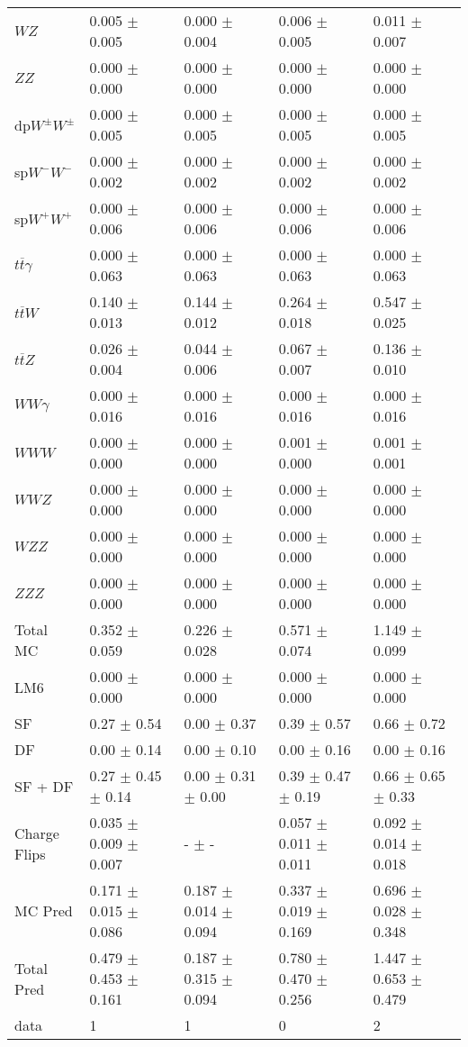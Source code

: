 \begin{tabular}{l | l l l l}
$WZ$ &  0.005 $\pm$  0.005 &  0.000 $\pm$  0.004 &  0.006 $\pm$  0.005 &  0.011 $\pm$  0.007\\
$ZZ$ &  0.000 $\pm$   0.000 &  0.000 $\pm$   0.000 &  0.000 $\pm$   0.000 &  0.000 $\pm$   0.000\\
\hline
dp$W^{\pm}W^{\pm}$ &  0.000 $\pm$  0.005 &  0.000 $\pm$  0.005 &  0.000 $\pm$  0.005 &  0.000 $\pm$  0.005\\
sp$W^{-}W^{-}$ &  0.000 $\pm$  0.002 &  0.000 $\pm$  0.002 &  0.000 $\pm$  0.002 &  0.000 $\pm$  0.002\\
sp$W^{+}W^{+}$ &  0.000 $\pm$  0.006 &  0.000 $\pm$  0.006 &  0.000 $\pm$  0.006 &  0.000 $\pm$  0.006\\
$t\overline{t}\gamma$ &  0.000 $\pm$  0.063 &  0.000 $\pm$  0.063 &  0.000 $\pm$  0.063 &  0.000 $\pm$  0.063\\
$t\overline{t}W$ &  0.140 $\pm$  0.013 &  0.144 $\pm$  0.012 &  0.264 $\pm$  0.018 &  0.547 $\pm$  0.025\\
$t\overline{t}Z$ &  0.026 $\pm$  0.004 &  0.044 $\pm$  0.006 &  0.067 $\pm$  0.007 &  0.136 $\pm$  0.010\\
$WW\gamma$ &  0.000 $\pm$  0.016 &  0.000 $\pm$  0.016 &  0.000 $\pm$  0.016 &  0.000 $\pm$  0.016\\
$WWW$ &   0.000 $\pm$   0.000 &   0.000 $\pm$   0.000 &  0.001 $\pm$   0.000 &  0.001 $\pm$  0.001\\
$WWZ$ &  0.000 $\pm$   0.000 &  0.000 $\pm$   0.000 &  0.000 $\pm$   0.000 &  0.000 $\pm$   0.000\\
$WZZ$ &  0.000 $\pm$   0.000 &  0.000 $\pm$   0.000 &  0.000 $\pm$   0.000 &  0.000 $\pm$   0.000\\
$ZZZ$ &  0.000 $\pm$   0.000 &   0.000 $\pm$   0.000 &   0.000 $\pm$   0.000 &   0.000 $\pm$   0.000\\
\hline
Total MC &  0.352 $\pm$  0.059 &  0.226 $\pm$  0.028 &  0.571 $\pm$  0.074 &  1.149 $\pm$  0.099\\
\hline\hline
\hline
LM6 &  0.000 $\pm$  0.000 &  0.000 $\pm$  0.000 &  0.000 $\pm$  0.000 &  0.000 $\pm$  0.000\\
\hline\hline
\hline\hline
 SF  & 0.27 $\pm$ 0.54 & 0.00 $\pm$ 0.37 & 0.39 $\pm$ 0.57 & 0.66 $\pm$ 0.72\\
 DF  & 0.00 $\pm$ 0.14 & 0.00 $\pm$ 0.10 & 0.00 $\pm$ 0.16 & 0.00 $\pm$ 0.16\\
\hline
 SF + DF  & 0.27 $\pm$ 0.45 $\pm$ 0.14 & 0.00 $\pm$ 0.31 $\pm$ 0.00 & 0.39 $\pm$ 0.47 $\pm$ 0.19 & 0.66 $\pm$ 0.65 $\pm$ 0.33\\
\hline\hline
Charge Flips & 0.035 $\pm$ 0.009 $\pm$ 0.007 & - $\pm$ - & 0.057 $\pm$ 0.011 $\pm$ 0.011 & 0.092 $\pm$ 0.014 $\pm$ 0.018\\
\hline\hline
\hline
MC Pred &  0.171 $\pm$  0.015 $\pm$  0.086 &  0.187 $\pm$  0.014 $\pm$  0.094 &  0.337 $\pm$  0.019 $\pm$  0.169 &  0.696 $\pm$  0.028 $\pm$  0.348\\
\hline\hline
Total Pred &  0.479 $\pm$  0.453 $\pm$  0.161 &  0.187 $\pm$  0.315 $\pm$  0.094 &  0.780 $\pm$  0.470 $\pm$  0.256 &  1.447 $\pm$  0.653 $\pm$  0.479\\
\hline\hline
data & 1 & 1 & 0 & 2\\
\hline\hline
\end{tabular}
